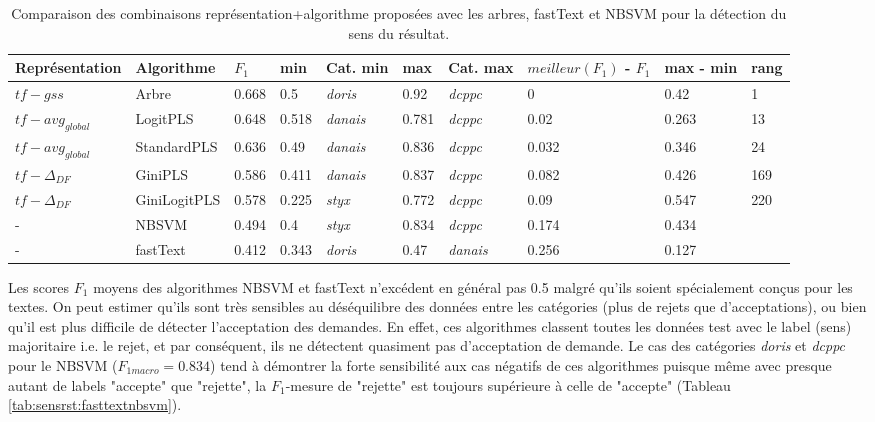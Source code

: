 \begin{table}[!htb]	
	\scriptsize
	
	
	
	\centering
	\begin{tabular}{|l|l|l|l|l|l|l|l|l|l|}
		\hline
		\textbf{Représentation} & \textbf{Algorithme} & \textbf{$F_{1}$} & \textbf{min} & \textbf{Cat. min} & \textbf{max} & \textbf{Cat. max} & \textbf{$meilleur(F_1)$ - $F_1$} & \textbf{max - min} & \textbf{rang} \\ \hline
		$tf-gss$ & Arbre & 0.668 & 0.5 & \textit{doris} & 0.92 & \textit{dcppc} & 0 & 0.42 & 1 \\ \hline
		$tf - avg_{global}$ & LogitPLS & 0.648 & 0.518 & \textit{danais} & 0.781 & \textit{dcppc} & 0.02 & 0.263 & 13 \\ \hline
		$tf - avg_{global}$ & StandardPLS & 0.636 & 0.49 & \textit{danais} & 0.836 & \textit{dcppc} & 0.032 & 0.346 & 24 \\ \hline
		$tf - \Delta_{DF}$ & GiniPLS & 0.586 & 0.411 & \textit{danais} & 0.837 & \textit{dcppc} & 0.082 & 0.426 & 169 \\ \hline
		$tf - \Delta_{DF}$ & GiniLogitPLS & 0.578 & 0.225 & \textit{styx} & 0.772 & \textit{dcppc} & 0.09 & 0.547 & 220 \\ \hline
		- & NBSVM & 0.494 & 0.4 & \textit{styx} & 0.834 & \textit{dcppc} & 0.174 & 0.434 & \\ \hline
		- & fastText & 0.412 & 0.343 & \textit{doris} & 0.47 & \textit{danais} & 0.256 & 0.127 & \\ \hline
	\end{tabular}
\caption{Comparaison des combinaisons représentation+algorithme proposées avec les arbres, fastText et NBSVM pour la détection du sens du résultat.}\label{tab:sensrst:global}
\end{table}

 Les scores $F_1$ moyens des algorithmes NBSVM et fastText n'excédent en général pas 0.5 malgré qu'ils soient spécialement conçus pour les textes. On peut estimer qu'ils sont très sensibles au déséquilibre des données entre les catégories (plus de rejets que d'acceptations), ou bien qu'il est plus difficile de détecter l'acceptation des demandes. En effet, ces algorithmes classent toutes les données test avec le label (sens) majoritaire i.e. le rejet, et par conséquent, ils ne détectent quasiment pas d'acceptation de demande. Le cas des catégories \textit{doris} et \textit{dcppc} pour le NBSVM ($F_{1macro} = 0.834$) tend à démontrer la forte sensibilité aux cas négatifs de ces algorithmes puisque même avec presque autant de labels "accepte" que "rejette", la $F_1$-mesure de "rejette" est toujours supérieure à celle de "accepte" (Tableau \ref{tab:sensrst:fasttextnbsvm}). 
 
